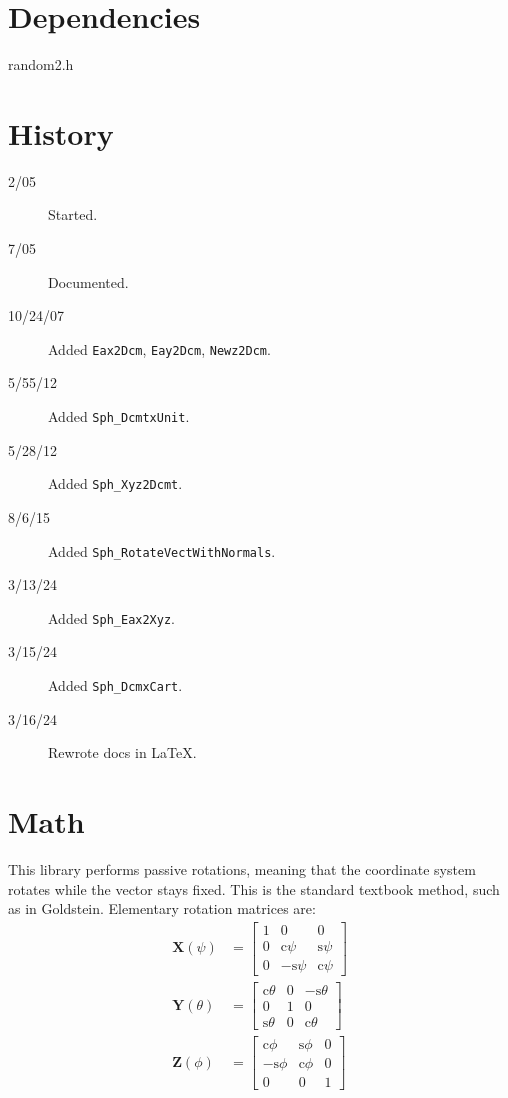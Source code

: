 \documentclass[11pt]{article}
\newcommand {\ttt} {\texttt}
\begin{document}
\section{Dependencies}
random2.h

\section{History}
\begin{description}

\item[2/05] Started.
\item[7/05] Documented.
\item[10/24/07] Added \ttt{Eax2Dcm}, \ttt{Eay2Dcm}, \ttt{Newz2Dcm}.
\item[5/55/12] Added \ttt{Sph\_DcmtxUnit}.
\item[5/28/12] Added \ttt{Sph\_Xyz2Dcmt}.
\item[8/6/15] Added \ttt{Sph\_RotateVectWithNormals}.
\item[3/13/24] Added \ttt{Sph\_Eax2Xyz}.
\item[3/15/24] Added \ttt{Sph\_DcmxCart}.
\item[3/16/24] Rewrote docs in LaTeX.

\end{description}


\section{Math}

This library performs passive rotations, meaning that the coordinate system rotates while the vector stays fixed. This is the standard textbook method, such as in Goldstein. Elementary rotation matrices are:
\begin{align*}
\bm{X}(\psi) &= \left[ \begin{array}{ccc} 1 & 0 & 0 \\ 0 & \textrm{c} \psi & \textrm{s} \psi \\ 0 & -\textrm{s} \psi & \textrm{c} \psi \end{array} \right]\\
\bm{Y}(\theta) &= \left[ \begin{array}{ccc} \textrm{c} \theta & 0 & -\textrm{s} \theta \\ 0 & 1 & 0 \\ \textrm{s} \theta & 0 & \textrm{c} \theta \end{array} \right] \\
\bm{Z}(\phi) &= \left[ \begin{array}{ccc} \textrm{c} \phi & \textrm{s} \phi & 0 \\ -\textrm{s} \phi & \textrm{c} \phi & 0 \\ 0 & 0 & 1 \end{array} \right]
\end{align*}
\end{document}
